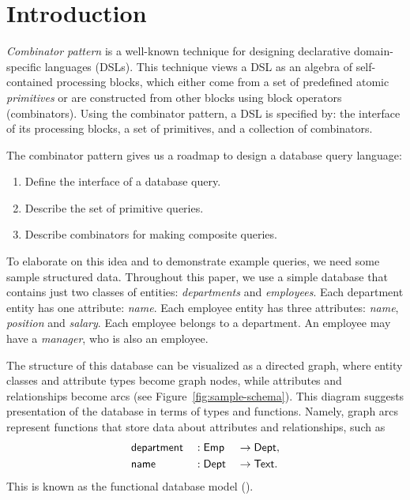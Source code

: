 
\section{Introduction}
\label{sec:introduction}

\emph{Combinator pattern} is a well-known technique for designing declarative
domain-specific languages (DSLs). This technique views a DSL as an algebra of
self-con\-tained processing blocks, which either come from a set of predefined
atomic \emph{primitives} or are constructed from other blocks using block
operators (combinators).  Using the combinator pattern, a DSL is specified by:
the interface of its processing blocks, a set of primitives, and a collection
of combinators.

The combinator pattern gives us a roadmap to design a database query language:

\begin{enumerate}
\item
Define the interface of a database query.
\item
Describe the set of primitive queries.
\item
Describe combinators for making composite queries.
\end{enumerate}

To elaborate on this idea and to demonstrate example queries, we need some
sample structured data.  Throughout this paper, we use a simple database that
contains just two classes of entities: \emph{departments} and \emph{employees}.
Each department entity has one attribute: \emph{name}.
Each employee entity has three attributes: \emph{name}, \emph{position} and
\emph{salary}.
Each employee belongs to a department.
An employee may have a \emph{manager}, who is also an employee.

The structure of this database can be visualized as a directed graph, where entity
classes and attribute types become graph nodes, while attributes and relationships
become arcs (see Figure~\ref{fig:sample-schema}).  This diagram
suggests presentation of the database in terms of types and functions.
Namely, graph arcs represent functions that store data about attributes and
relationships, such as
\begin{alignat*}{3}
    & \textup{\textsf{department}} && : \textup{\textsf{Emp}} && \to \textup{\textsf{Dept}}, \\
    & \textup{\textsf{name}} && : \textup{\textsf{Dept}} && \to \textup{\textsf{Text}}.
\end{alignat*}
This is known as the functional database model (\cite{Kerschberg1976}).

